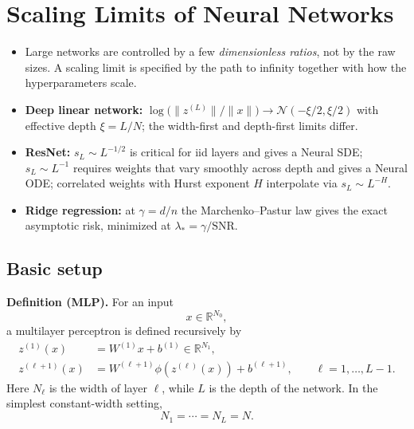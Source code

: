 \chapter{Scaling Limits of Neural Networks}
\label{ch:lecture2}

\begin{keyideas}
\begin{itemize}
    \item Large networks are controlled by a few \emph{dimensionless ratios},
    not by the raw sizes. A scaling limit is specified by the path to
    infinity together with how the hyperparameters scale.
    \item \textbf{Deep linear network:}
    $\log\bigl(\|z^{(L)}\|/\|x\|\bigr)\to\mathcal N(-\xi/2,\xi/2)$ with
    effective depth $\xi=L/N$; the width-first and depth-first limits differ.
    \item \textbf{ResNet:} $s_L\sim L^{-1/2}$ is critical for iid layers and
    gives a Neural SDE; $s_L\sim L^{-1}$ requires weights that vary smoothly
    across depth and gives a Neural ODE; correlated weights with Hurst
    exponent $H$ interpolate via $s_L\sim L^{-H}$.
    \item \textbf{Ridge regression:} at $\gamma=d/n$ the Marchenko--Pastur law
    gives the exact asymptotic risk, minimized at
    $\lambda_*=\gamma/\mathrm{SNR}$.
\end{itemize}
\end{keyideas}

\section{Basic setup}

\textbf{Definition (MLP).}
For an input
\[
x\in\mathbb{R}^{N_0},
\]
a multilayer perceptron is defined recursively by
\begin{align}
    z^{(1)}(x)
    &=
    W^{(1)}x+b^{(1)}
    \in\mathbb{R}^{N_1},
    \\
    z^{(\ell+1)}(x)
    &=
    W^{(\ell+1)}
    \phi\!\left(z^{(\ell)}(x)\right)
    +
    b^{(\ell+1)},
    \qquad
    \ell=1,\dots,L-1.
\end{align}
Here \(N_\ell\) is the width of layer \(\ell\), while \(L\) is the
depth of the network.  In the simplest constant-width setting,
\[
N_1=\cdots=N_L=N.
\]

\medskip

